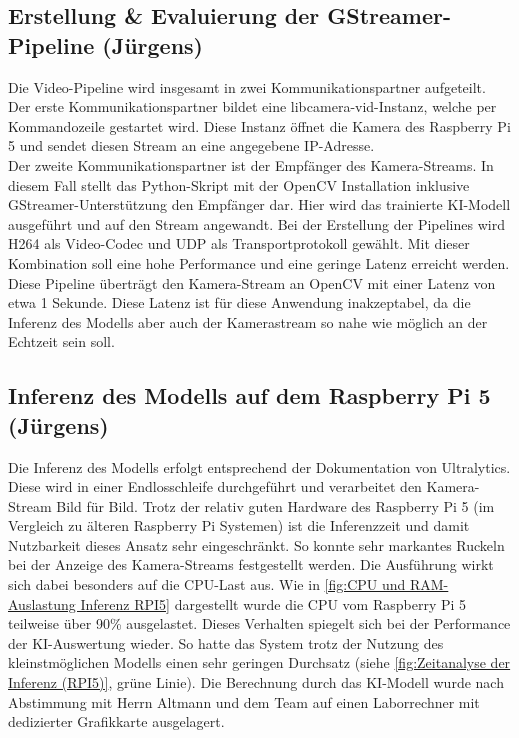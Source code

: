 \subsection{Erstellung \& Evaluierung der GStreamer-Pipeline (Jürgens)}
Die Video-Pipeline wird insgesamt in zwei Kommunikationspartner aufgeteilt. Der erste Kommunikationspartner bildet eine libcamera-vid-Instanz, welche per Kommandozeile gestartet wird. Diese Instanz öffnet die Kamera des Raspberry Pi 5 und sendet diesen Stream an eine angegebene IP-Adresse. \\
Der zweite Kommunikationspartner ist der Empfänger des Kamera-Streams. In diesem Fall stellt das Python-Skript mit der OpenCV Installation inklusive GStreamer-Unterstützung den Empfänger dar. Hier wird das trainierte KI-Modell ausgeführt und auf den Stream angewandt.
Bei der Erstellung der Pipelines wird H264 als Video-Codec und UDP als Transportprotokoll gewählt. Mit dieser Kombination soll eine hohe Performance und eine geringe Latenz erreicht werden.\\
Diese Pipeline überträgt den Kamera-Stream an OpenCV mit einer Latenz von etwa 1 Sekunde. Diese Latenz ist für diese Anwendung inakzeptabel, da die Inferenz des Modells aber auch der Kamerastream so nahe wie möglich an der Echtzeit sein soll. 

\subsection{Inferenz des Modells auf dem Raspberry Pi 5 (Jürgens)}
Die Inferenz des Modells erfolgt entsprechend der Dokumentation von Ultralytics. Diese wird in einer Endlosschleife durchgeführt und verarbeitet den Kamera-Stream Bild für Bild. Trotz der relativ guten Hardware des Raspberry Pi 5 (im Vergleich zu älteren Raspberry Pi Systemen) ist die Inferenzzeit und damit Nutzbarkeit dieses Ansatz sehr eingeschränkt. So konnte sehr markantes Ruckeln bei der Anzeige des Kamera-Streams festgestellt werden. Die Ausführung wirkt sich dabei besonders auf die CPU-Last aus. Wie in \ref{fig:CPU und RAM-Auslastung Inferenz RPI5} dargestellt wurde die CPU vom Raspberry Pi 5 teilweise über 90\% ausgelastet. Dieses Verhalten spiegelt sich bei der Performance der KI-Auswertung wieder. So hatte das System trotz der Nutzung des kleinstmöglichen Modells einen sehr geringen Durchsatz (siehe \ref{fig:Zeitanalyse der Inferenz (RPI5)}, grüne Linie). Die Berechnung durch das KI-Modell wurde nach Abstimmung mit Herrn Altmann und dem Team auf einen Laborrechner mit dedizierter Grafikkarte ausgelagert.


